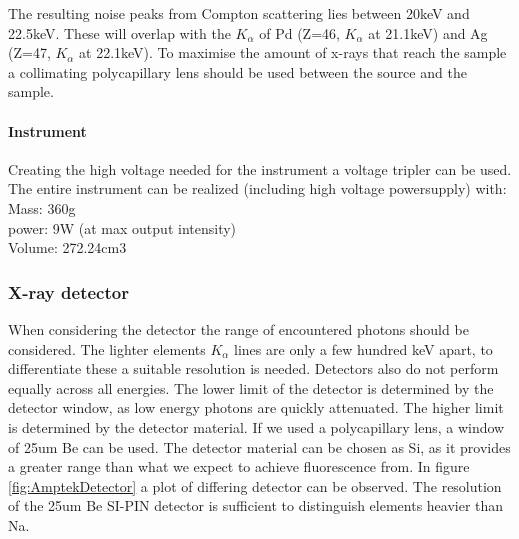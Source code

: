 The resulting noise peaks from Compton scattering lies between 20keV and 22.5keV. These will overlap with the $K_\alpha$ of Pd (Z=46, $K_\alpha$ at 21.1keV) and Ag (Z=47, $K_\alpha$ at 22.1keV).
To maximise the amount of x-rays that reach the sample a collimating polycapillary lens should be used between the source and the sample.

\paragraph{Instrument}
Creating the high voltage needed for the instrument a voltage tripler can be used. The entire instrument can be realized (including high voltage powersupply) with\citep{AmptekSource}:\\
Mass: 360g\\
power: 9W (at max output intensity)\\
Volume: 272.24cm3

\subsubsection{X-ray detector}
When considering the detector the range of encountered photons should be considered. The lighter elements $K_\alpha$ lines are only a few hundred keV apart, to differentiate these a suitable resolution is needed. Detectors also do not perform equally across all energies. The lower limit of the detector is determined by the detector window, as low energy photons are quickly attenuated. The higher limit is determined by the detector material. If we used a polycapillary lens, a window of 25um Be can be used. The detector material can be chosen as Si, as it provides a greater range than what we expect to achieve fluorescence from. In figure \ref{fig:AmptekDetector} a plot of differing detector can be observed. The resolution of the 25um Be SI-PIN detector is sufficient to distinguish elements heavier than Na.

